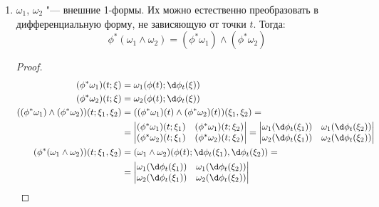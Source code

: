 \begin{enumerate}
\item
	$\omega_1$, $\omega_2$ "--- внешние 1-формы.
	Их можно естественно преобразовать в дифференциальную форму, не зависяющую от точки $t$.
	Тогда:
	\[ \phi^*(\omega_1 \wedge \omega_2) = (\phi^* \omega_1) \wedge (\phi^* \omega_2) \]
	\begin{proof}
		\begin{align*}
			(\phi^* \omega_1) (t; \xi) &= \omega_1(\phi(t); \d \phi_t(\xi)) \\
			(\phi^* \omega_2) (t; \xi) &= \omega_2(\phi(t); \d \phi_t(\xi)) \\
			((\phi^* \omega_1) \wedge (\phi^* \omega_2)) (t; \xi_1, \xi_2)
			&= ((\phi^* \omega_1)(t) \wedge (\phi^* \omega_2)(t)) (\xi_1, \xi_2) = \\
			&= \begin{vmatrix}
				(\phi^* \omega_1)(t; \xi_1) & (\phi^* \omega_1)(t; \xi_2) \\
				(\phi^* \omega_2)(t; \xi_1) & (\phi^* \omega_2)(t; \xi_2) \\
			\end{vmatrix}
			= \begin{vmatrix}
				\omega_1(\d \phi_t(\xi_1)) & \omega_1(\d \phi_t(\xi_2)) \\
				\omega_2(\d \phi_t(\xi_1)) & \omega_2(\d \phi_t(\xi_2)) \\
			\end{vmatrix} \\
			(\phi^* (\omega_1 \wedge \omega_2)) (t; \xi_1, \xi_2)
			&= (\omega_1 \wedge \omega_2)(\phi(t); \d \phi_t(\xi_1), \d \phi_t(\xi_2)) = \\
			&= \begin{vmatrix}
				\omega_1(\d \phi_t(\xi_1)) & \omega_1(\d \phi_t(\xi_2)) \\
				\omega_2(\d \phi_t(\xi_1)) & \omega_2(\d \phi_t(\xi_2)) \\
			\end{vmatrix}
		\end{align*}
	\end{proof}
\end{enumerate}

